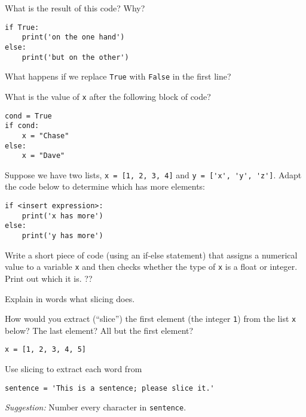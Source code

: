 \documentclass[11pt]{exam}
\begin{document}
\begin{questions}
\item What is the result of this code?  Why?
\begin{verbatim}
if True:
    print('on the one hand')
else:  
    print('but on the other')    
\end{verbatim} 
What happens if we replace {\tt True} with {\tt False} in the first line?

\item What is the value of \texttt{x} after the following block of code?
\begin{verbatim}
cond = True
if cond:
    x = "Chase"
else:
    x = "Dave"
\end{verbatim}

\item Suppose we have two lists, 
{\tt x = [1, 2, 3, 4]} and \verb|y = ['x', 'y', 'z']|.  
Adapt the code below to determine which has more elements: 
\begin{verbatim}
if <insert expression>:
    print('x has more')
else:
    print('y has more')
\end{verbatim}


\item Write a short piece of code (using an if-else statement) that 
assigns a numerical value to a variable \texttt{x} and then checks whether the type of \texttt{x} is a float or integer. Print out which it is. ??

\item Explain in words what slicing does.  

\item How would you extract (``slice'') the first element (the integer {\tt 1}) from the list {\tt x} below?  
The last element?  All but the first element?  
\begin{verbatim}
x = [1, 2, 3, 4, 5]
\end{verbatim}

\item Use slicing to extract each word from
\begin{verbatim}
sentence = 'This is a sentence; please slice it.'
\end{verbatim}
{\it Suggestion:\/} Number every character in {\tt sentence}. 



\end{questions}
\end{document}
